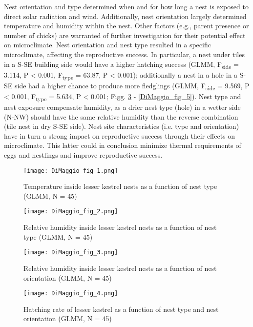 Nest orientation and type determined when and for how long a nest is
exposed to direct solar radiation and wind.  Additionally, nest
orientation largely determined temperature and humidity within the
nest. Other factors (e.g., parent presence or number of chicks) are
warranted of further investigation for their potential effect on
microclimate. Nest orientation and nest type resulted in a specific
microclimate, affecting the reproductive success. In particular, a nest
under tiles in a S-SE building side would have a higher hatching
success (GLMM, F\textsubscript{side} = 3.114, P {\textless} 0.001,
F\textsubscript{type  } = 63.87, P {\textless} 0.001); additionally a
nest in a hole in a S-SE side had a higher chance to produce more
fledglings (GLMM, F\textsubscript{side} = 9.569, P {\textless} 0.001,
F\textsubscript{type  } = 5.634, P {\textless} 0.001; Figg. \ref{DiMaggio_fig_4} - \ref{DiMaggio_fig_5}).
Nest type and nest exposure compensate humidity, as a drier nest type
(hole) in a wetter side (N-NW) should have the same relative humidity
than the reverse combination (tile nest in dry S-SE side). Nest site
characteristics (i.e. type and orientation) have in turn a strong
impact on reproductive success through their effects on microclimate.
This latter could in conclusion minimize thermal requirements of eggs
and nestlings and improve reproductive success. 


\newpage
\begin{figure}[!h]
\centering
\begin{minipage}{0.49\textwidth}
\centering
	\texttt{[image: DiMaggio\_fig\_1.png]}
	\caption{Temperature inside lesser kestrel nests as a function of nest type (GLMM, N = 45)}
	\label{DiMaggio_fig_1}
\end{minipage}\hfill
\begin{minipage}{0.49\textwidth}
\centering
	\texttt{[image: DiMaggio\_fig\_2.png]}
	\caption{Relative humidity inside lesser kestrel nests as a function of nest type (GLMM, N = 45)}
	\label{DiMaggio_fig_2}
\end{minipage}
\end{figure}

\begin{figure}[!h]
\centering
	\texttt{[image: DiMaggio\_fig\_3.png]}
	\caption{Relative humidity inside lesser kestrel nests as a function of nest orientation (GLMM, N = 45)}
	\label{DiMaggio_fig_3}
\end{figure}

\begin{figure}[!h]
\centering
	\texttt{[image: DiMaggio\_fig\_4.png]}
	\caption{Hatching rate of lesser kestrel as a function of nest type and nest orientation (GLMM, N = 45)}
	\label{DiMaggio_fig_4}
\end{figure}

